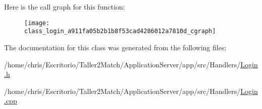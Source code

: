 Here is the call graph for this function\+:
\nopagebreak
\begin{figure}[H]
\begin{center}
\leavevmode
\texttt{[image: class\_login\_a911fa05b2b1b8f53cad4286012a7810d\_cgraph]}
\end{center}
\end{figure}




The documentation for this class was generated from the following files\+:\begin{DoxyCompactItemize}
\item 
/home/chris/\+Escritorio/\+Taller2\+Match/\+Application\+Server/app/src/\+Handlers/\hyperlink{_login_8h}{Login.\+h}\item 
/home/chris/\+Escritorio/\+Taller2\+Match/\+Application\+Server/app/src/\+Handlers/\hyperlink{_login_8cpp}{Login.\+cpp}\end{DoxyCompactItemize}
